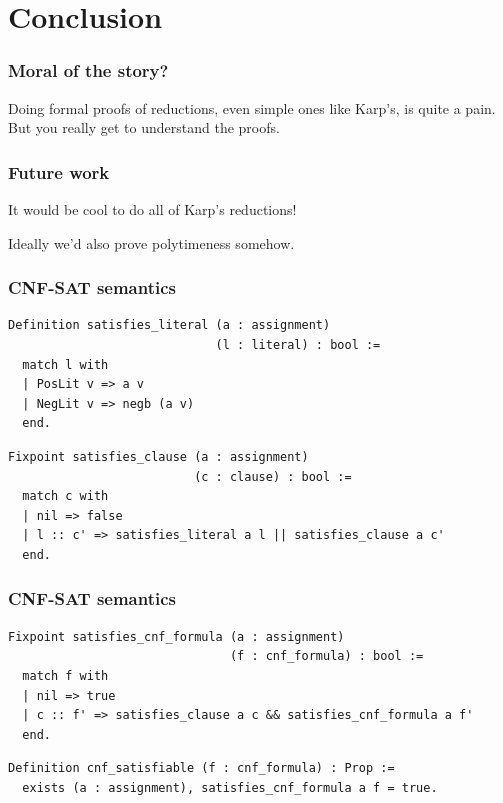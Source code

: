 \documentclass{beamer}
\begin{document}
\section{Conclusion}

\begin{frame}
  \frametitle{Moral of the story?}

  Doing formal proofs of reductions, even simple ones like Karp's, is quite a
  pain. But you really get to understand the proofs.
\end{frame}

\begin{frame}
  \frametitle{Future work}

  It would be cool to do all of Karp's reductions!

  Ideally we'd also prove polytimeness somehow.
\end{frame}


\begin{frame}[fragile]
  \frametitle{CNF-SAT semantics}

  \begin{verbatim}
Definition satisfies_literal (a : assignment)
                             (l : literal) : bool :=
  match l with
  | PosLit v => a v
  | NegLit v => negb (a v)
  end.
  \end{verbatim}

  \pause
  \begin{verbatim}
Fixpoint satisfies_clause (a : assignment)
                          (c : clause) : bool :=
  match c with
  | nil => false
  | l :: c' => satisfies_literal a l || satisfies_clause a c'
  end.
  \end{verbatim}
\end{frame}

\begin{frame}[fragile]
  \frametitle{CNF-SAT semantics}

  \begin{verbatim}
Fixpoint satisfies_cnf_formula (a : assignment)
                               (f : cnf_formula) : bool :=
  match f with
  | nil => true
  | c :: f' => satisfies_clause a c && satisfies_cnf_formula a f'
  end.
  \end{verbatim}

  \pause
  \begin{verbatim}
Definition cnf_satisfiable (f : cnf_formula) : Prop :=
  exists (a : assignment), satisfies_cnf_formula a f = true.
  \end{verbatim}
\end{frame}
\end{document}
